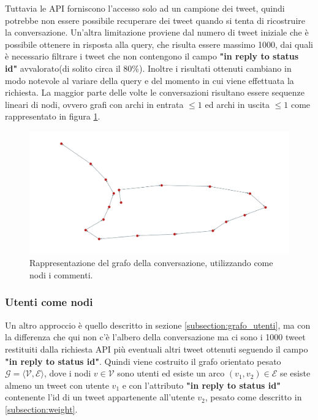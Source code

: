 Tuttavia le API forniscono l'accesso solo ad un campione dei tweet, quindi potrebbe non essere possibile recuperare dei tweet quando si tenta di ricostruire la conversazione. Un'altra limitazione proviene dal numero di tweet iniziale che è possibile ottenere in risposta alla query, che risulta essere massimo 1000, dai quali è necessario filtrare i tweet che non contengono il campo \textbf{"in reply to status id"} avvalorato(di solito circa il 80\%). Inoltre i risultati ottenuti cambiano in modo notevole al variare della query e del momento in cui viene effettuata la richiesta. La maggior parte delle volte le conversazioni risultano essere sequenze lineari di nodi, ovvero grafi con archi in entrata $\leq 1$ ed archi in uscita $\leq 1$ come rappresentato in figura \ref{fig:comment-twitter}.

\begin{figure}[ht]
    \includegraphics[width=\linewidth]{Immagini/twitter.png}
    \caption{Rappresentazione del grafo della conversazione, utilizzando come nodi i commenti.}
    \label{fig:comment-twitter}
\end{figure}

\subsubsection {Utenti come nodi}
Un altro approccio è quello descritto in sezione \ref{subsection:grafo_utenti}, ma con la differenza che qui non c'è l'albero della conversazione ma ci sono i 1000 tweet restituiti dalla richiesta API più eventuali altri tweet ottenuti seguendo il campo \textbf{"in reply to status id"}. Quindi viene costruito il grafo orientato pesato $\mathcal{G = ⟨V, E⟩}$, dove i nodi $v \in \mathcal{V}$ sono utenti ed esiste un arco $(v_1,v_2) \in \mathcal{E}$ se esiste almeno un tweet con utente $v_1$ e con l'attributo \textbf{"in reply to status id"} contenente l'id di un tweet appartenente all'utente $v_2$, pesato come descritto in \ref{subsection:weight}.

